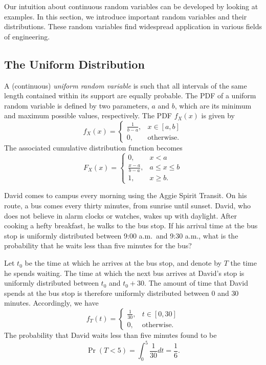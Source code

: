 Our intuition about continuous random variables can be developed by looking at examples.
In this section, we introduce important random variables and their distributions.
These random variables find widespread application in various fields of engineering.


\subsection{The Uniform Distribution}

A (continuous) \emph{uniform random variable} is such that all intervals of the same length contained within its support are equally probable. 
The PDF of a uniform random variable is defined by two parameters, $a$ and $b$, which are its minimum and maximum possible values, respectively.
The PDF $f_X(x)$ is given by
\begin{equation*}
f_X(x) = \begin{cases} \frac{1}{b-a}, & x \in [a, b] \\
0, & \text{otherwise}. \end{cases}
\end{equation*}
The associated cumulative distribution function becomes
\begin{equation*}
F_X(x) = \begin{cases} 0, & x < a \\
\frac{x-a}{b-a}, & a \leq x \leq b \\
1, & x \geq b . \end{cases}
\end{equation*}

\begin{example}
David comes to campus every morning using the Aggie Spirit Transit.
On his route, a bus comes every thirty minutes, from sunrise until sunset.
David, who does not believe in alarm clocks or watches, wakes up with daylight.
After cooking a hefty breakfast, he walks to the bus stop.
If his arrival time at the bus stop is uniformly distributed between 9:00 a.m.\ and 9:30 a.m., what is the probability that he waits less than five minutes for the bus?

Let $t_0$ be the time at which he arrives at the bus stop, and denote by $T$ the time he spends waiting.
The time at which the next bus arrives at David's stop is uniformly distributed between $t_0$ and $t_0 + 30$.
The amount of time that David spends at the bus stop is therefore uniformly distributed between $0$ and $30$ minutes.
Accordingly, we have
\begin{equation*}
f_T(t) = \begin{cases} \frac{1}{30}, & t \in [0, 30] \\
0, & \text{otherwise}. \end{cases}
\end{equation*}
The probability that David waits less than five minutes found to be
\begin{equation*}
\Pr (T < 5) = \int_0^5 \frac{1}{30} dt = \frac{1}{6} .
\end{equation*}
\end{example}


